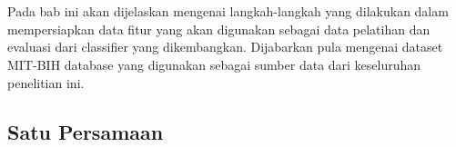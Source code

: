 \chapter{\babTiga}
Pada bab ini akan dijelaskan mengenai langkah-langkah yang dilakukan dalam
mempersiapkan data fitur yang akan digunakan sebagai data pelatihan dan evaluasi
dari classifier yang dikembangkan. Dijabarkan pula mengenai dataset MIT-BIH
database yang digunakan sebagai sumber data dari keseluruhan penelitian ini.


\section{Satu Persamaan}
